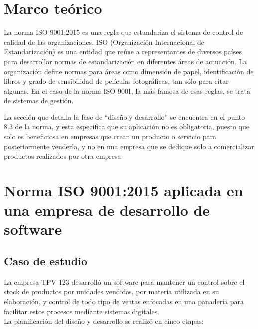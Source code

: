 \documentclass[12pt]{article}
\begin{document}


\doublespacing
\tableofcontents
\newpage


\section{Marco teórico}
La norma ISO 9001:2015 es una regla que estandariza el sistema de control de calidad de las organizaciones. ISO (Organización Internacional de Estandarización) es una entidad que reúne a representantes de diversos países para desarrollar normas de estandarización en diferentes áreas de actuación. La organización define normas para áreas como dimensión de papel, identificación de libros y grado de sensibilidad de películas fotográficas, tan sólo para citar algunas. En el caso de la norma ISO 9001, la más famosa de esas reglas, se trata de sistemas de gestión.

La sección que detalla la fase de ``diseño y desarrollo'' se encuentra en el punto 8.3 de la norma, y esta especifica que su aplicación no es obligatoria, puesto que solo es beneficiosa en empresas que crean un producto o servicio para posteriormente venderla, y no en una empresa que se dedique solo a comercializar productos realizados por otra empresa\\

\section{Norma ISO 9001:2015 aplicada en una empresa de desarrollo de software}     
\subsection{Caso de estudio}
La empresa TPV 123 desarrolló un software para mantener un control sobre el stock de productos por unidades vendidas, por materia utilizada en su elaboración, y control de todo tipo de ventas enfocadas en una panadería para facilitar estos procesos mediante sistemas digitales.\\

La planificación del diseño y desarrollo se realizó en cinco etapas:
\end{document}
